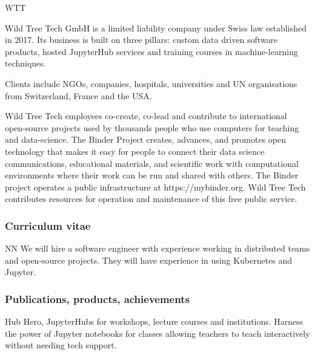 \begin{sitedescription}{WTT}
\label{sitedescription:euxfel}

Wild Tree Tech GmbH is a limited liability company under Swiss law established
in 2017. Its business is built on three pillars: custom data driven software products,
hosted JupyterHub services and training courses in machine-learning techniques.

Clients include NGOs, companies, hospitals, universities and UN organisations
from Switzerland, France and the USA.

Wild Tree Tech employees co-create, co-lead and contribute to international
open-source projects used by thousands people who use computers for teaching
and data-science. The Binder Project creates, advances, and promotes
open technology that makes it easy for people to connect their data
science communications, educational materials, and scientific work with
computational environments where their work can be run and shared with others.
The Binder project operates a public infrastructure at https://mybinder.org.
Wild Tree Tech contributes resources for operation and maintenance of this
free public service.



\subsubsection*{Curriculum vitae}




\begin{participant}[type=res,PM=24,salary=9580]{NN} %
  We will hire a software engineer with experience working in distributed teams
  and open-source projects. They will have experience in using Kubernetes and
  Jupyter.
\end{participant}

\subsubsection*{Publications, products, achievements}

\begin{compactenum}
\item Hub Hero, JupyterHubs for workshops, lecture courses and institutions. Harness the power of Jupyter notebooks for classes allowing teachers to teach interactively without needing tech support.
\end{compactenum}


\end{sitedescription}
